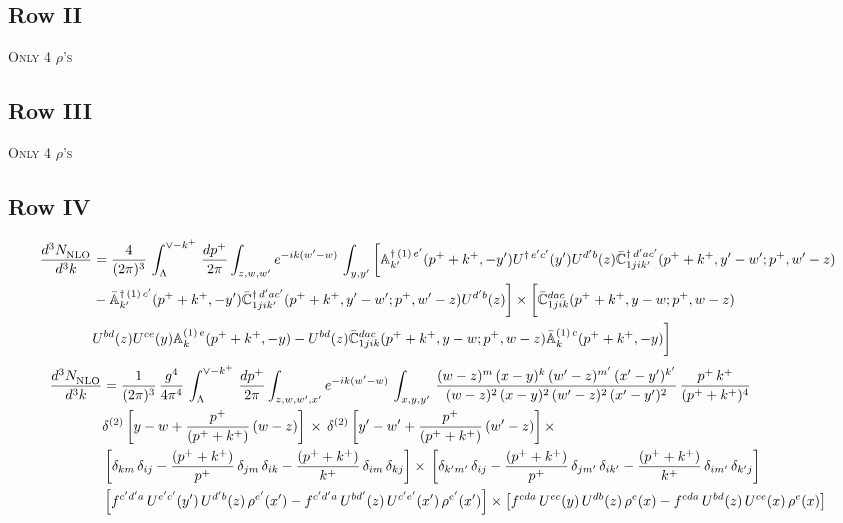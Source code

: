 \documentclass[9pt]{article}
\def\mf#1{\mathbb{#1}}
\numberwithin{equation}{section}
\begin{document}
\subsection{Row II\,}
\textsc{Only 4 $\rho$'s}
\subsection{Row III\,}
\textsc{Only 4 $\rho$'s}
\subsection{Row IV\,}
\begin{align}
    \frac{d^{3}N_{\rm NLO}^{\rm}}{d^{3}k}  & = \frac{4}{(2\pi)^{3}}\,\int_{\Lambda}^{\vee-k^{+}}\, \frac{dp^{+}}{2\pi}\int_{z,w,w^{\prime}} e^{-ik(w^{\prime}-w)}\,  \int_{y,y^{\prime}}\bigg[\mf{A}^{\dagger\, (1)\,e^{\prime}}_{k^{\prime}}(p^{+}+k^{+},-y^{\prime})U^{\dagger\, e^{\prime}c^{\prime}}(y^{\prime})U^{d^{\prime}b}(z) \Bar{\mf{C}}^{\dagger\, d^{\prime}ac^{\prime}}_{1jik^{\prime}}(p^{+}+k^{+},y^{\prime}-w^{\prime}; p^{+},w^{\prime}-z) \notag \\ &  -\Bar{\mf{A}}^{\dagger\, (1)\,c^{\prime}}_{k^{\prime}}(p^{+}+k^{+},-y^{\prime}) \Bar{\mf{C}}^{\dagger\, d^{\prime}ac^{\prime}}_{1jik^{\prime}}(p^{+}+k^{+},y^{\prime}-w^{\prime}; p^{+},w^{\prime}-z)U^{d^{\prime}b}(z)\bigg]\times\bigg[\Bar{\mf{C}}^{dac}_{1jik}(p^{+}+k^{+},y-w; p^{+},w-z)\notag \\ & U^{bd}(z)U^{ce}(y) \mf{A}^{(1)\,e}_{k}(p^{+}+k^{+},-y) -U^{bd}(z) \Bar{\mf{C}}^{dac}_{1jik}(p^{+}+k^{+},y-w; p^{+},w-z)\Bar{\mf{A}}^{(1)\,c}_{k}(p^{+}+k^{+},-y)\bigg]\nonumber
\end{align}
\begin{align}
     \frac{d^{3}N_{\rm NLO}^{\rm}}{d^{3}k}  & = \frac{1}{(2\pi)^{3}}\,\frac{g^{4}}{4\pi^{4}}\,\int_{\Lambda}^{\vee-k^{+}}\, \frac{dp^{+}}{2\pi}\int_{z,w,w^{\prime},x'} e^{-ik(w^{\prime}-w)}\,  \int_{x,y,y^{\prime}}\,\frac{(w-z)^{m}\,(x-y)^{k}\,(w'-z)^{m'}\,(x'-y')^{k'}}{(w-z)^{2}\,(x-y)^{2}\,(w'-z)^{2}\,(x'-y')^{2}}\,\frac{p^{+}\,k^{+}}{(p^{+}+k^{+})^{4}}\notag \\ & \delta^{(2)}\left[y-w+\frac{p^{+}}{(p^{+}+k^{+})}\,(w-z)\right]\,\times\, \delta^{(2)}\left[y'-w'+\frac{p^{+}}{(p^{+}+k^{+})}\,(w'-z)\right]\times\notag \\ &  \left[\delta_{km}\,\delta_{ij}-\frac{(p^{+}+k^{+})}{p^{+}}\,\delta_{jm}\,\delta_{ik}-\frac{(p^{+}+k^{+})}{k^{+}}\,\delta_{im}\,\delta_{kj}\right]\times\, \left[\delta_{k'm'}\,\delta_{ij}-\frac{(p^{+}+k^{+})}{p^{+}}\,\delta_{jm'}\,\delta_{ik'}-\frac{(p^{+}+k^{+})}{k^{+}}\,\delta_{im'}\,\delta_{k'j}\right]\notag \\ & \left[f^{c'd'a}\,U^{e'c'}(y')\,U^{d'b}(z)\,\rho^{e'}(x')-f^{c'd'a}\, 
    U^{bd'}(z)\,U^{c'e'}(x')\,\rho^{e'}(x')\right]\times \left[f^{cda}\,U^{ec}(y)\,U^{db}(z)\,\rho^{e}(x)-f^{cda}\, 
    U^{bd}(z)\,U^{ce}(x)\,\rho^{e}(x)\right]
\end{align}
\end{document}

